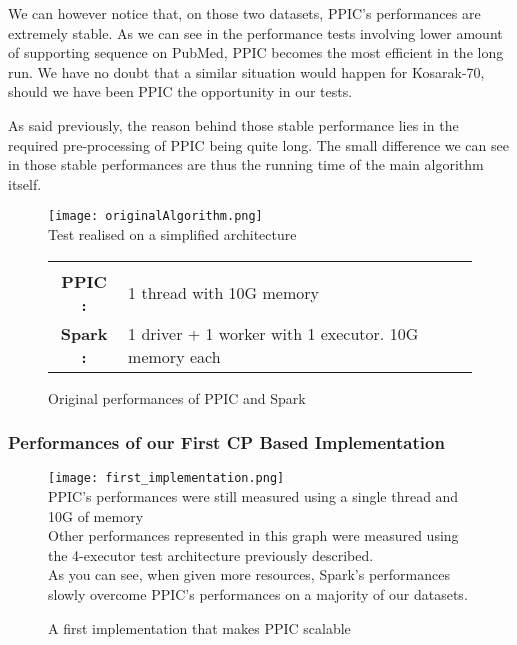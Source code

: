 \documentclass{eplmastersthesis}
\newcommand\danger{%
 \makebox[1.4em][c]{%
 \makebox[0pt][c]{\raisebox{.1em}{\small!}}%
 \makebox[0pt][c]{\color{red}\Large$\bigtriangleup$}}}%
\begin{document}
We can however notice that, on those two datasets, PPIC's performances are extremely stable. As we can see in the performance tests involving lower amount of supporting sequence on PubMed, PPIC becomes the most efficient in the long run. We have no doubt that a similar situation would happen for Kosarak-70, should we have been PPIC the opportunity in our tests. \newline

As said previously, the reason behind those stable performance lies in the required pre-processing of PPIC being quite long. The small difference we can see in those stable performances are thus the running time of the main algorithm itself.

\begin{figure}[h]
  \centering
  \texttt{[image: originalAlgorithm.png]} \\
  \danger  Test realised on a simplified architecture \danger \\
  \begin{tabular}{c l}
  	 & \\
  	\textbf{PPIC :} & 1 thread  with 10G memory \\
  	\textbf{Spark :} & 1 driver + 1 worker with 1 executor. 10G memory each
  \end{tabular}
  \caption{Original performances of PPIC and Spark}
  \label{fig:originalAlgorithmPerformances}
\end{figure}

\subsubsection{Performances of our First CP Based Implementation}

\begin{figure}[h]
  \centering
  \texttt{[image: first\_implementation.png]} \\
  \danger PPIC's performances were still measured using a single thread and 10G of memory \danger \\
  Other performances represented in this graph were measured using the 4-executor test architecture previously described. \\
  As you can see, when given more resources, Spark's performances slowly overcome PPIC's performances on a majority of our datasets. 
  \caption{A first implementation that makes PPIC scalable}
  \label{fig:first_scalable_CPbased_implementation}
\end{figure}
\end{document}
